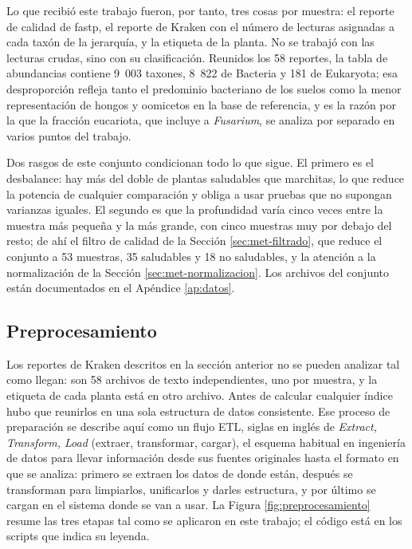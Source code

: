 Lo que recibió este trabajo fueron, por tanto, tres cosas por muestra: el reporte de calidad de
fastp, el reporte de Kraken con el número de lecturas asignadas a cada taxón de la jerarquía, y la
etiqueta de la planta. No se trabajó con las lecturas crudas, sino con su clasificación. Reunidos los
58 reportes, la tabla de abundancias contiene 9~003 taxones, 8~822 de Bacteria y 181 de Eukaryota;
esa desproporción refleja tanto el predominio bacteriano de los suelos como la menor representación
de hongos y oomicetos en la base de referencia, y es la razón por la que la fracción eucariota, que
incluye a \textit{Fusarium}, se analiza por separado en varios puntos del trabajo.

Dos rasgos de este conjunto condicionan todo lo que sigue. El primero es el desbalance: hay más del
doble de plantas saludables que marchitas, lo que reduce la potencia de cualquier comparación y
obliga a usar pruebas que no supongan varianzas iguales. El segundo es que la profundidad varía
cinco veces entre la muestra más pequeña y la más grande, con cinco muestras muy por debajo del
resto; de ahí el filtro de calidad de la Sección \ref{sec:met-filtrado}, que reduce el conjunto a
53 muestras, 35 saludables y 18 no saludables, y la atención a la normalización de la
Sección \ref{sec:met-normalizacion}. Los archivos del conjunto están documentados en el
Apéndice \ref{ap:datos}.

\subsection{Preprocesamiento}
\label{sec:met-preprocesamiento}

Los reportes de Kraken descritos en la sección anterior no se pueden analizar tal como llegan: son
58 archivos de texto independientes, uno por muestra, y la etiqueta de cada planta está en otro
archivo. Antes de calcular cualquier índice hubo que reunirlos en una sola estructura de datos
consistente. Ese proceso de preparación se describe aquí como un flujo ETL, siglas en inglés de
\emph{Extract, Transform, Load} (extraer, transformar, cargar), el esquema habitual en ingeniería de
datos para llevar información desde sus fuentes originales hasta el formato en que se analiza:
primero se extraen los datos de donde están, después se transforman para limpiarlos, unificarlos y
darles estructura, y por último se cargan en el sistema donde se van a usar. La
Figura \ref{fig:preprocesamiento} resume las tres etapas tal como se aplicaron en este trabajo; el
código está en los scripts que indica su leyenda.

